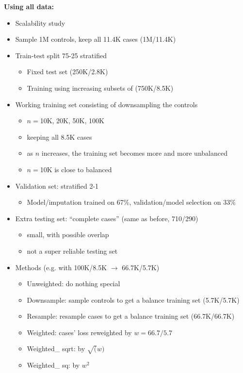 \documentclass[12pt]{article}
\begin{document}
\textbf{Using all data:}
\begin{itemize}
	\item Scalability study
	\item Sample 1M controls, keep all 11.4K cases (1M/11.4K)
	\item Train-test split 75-25 stratified
	\begin{itemize}
		\item Fixed test set (250K/2.8K)
		\item Training using increasing subsets of (750K/8.5K)
	\end{itemize}
	\item Working training set consisting of downsampling the controls
	\begin{itemize}
		\item $n=$10K, 20K, 50K, 100K
		\item keeping all 8.5K cases
		\item as $n$ increases, the training set becomes more and more unbalanced
		\item $n=$10K is close to balanced
	\end{itemize}
	\item Validation set: stratified 2-1
	\begin{itemize}
		\item Model/imputation trained on 67\%, validation/model selection on 33\%
	\end{itemize}
	\item Extra testing set: ``complete cases'' (same as before, 710/290)
	\begin{itemize}
		\item small, with possible overlap 
		\item not a super reliable testing set
	\end{itemize}
	\item Methods (e.g. with 100K/8.5K $\to$ 66.7K/5.7K)
	\begin{itemize}
		\item Unweighted: do nothing special
		\item Downsample: sample controls to get a balance training set (5.7K/5.7K)
		\item Resample: resample cases to get a balance training set (66.7K/66.7K)
		\item Weighted: cases' loss reweighted by $w=66.7/5.7$
		\item Weighted\_ sqrt: by $\sqrt(w)$
		\item Weighted\_ sq: by $w^2$
	\end{itemize}
\end{itemize}
\end{document}
